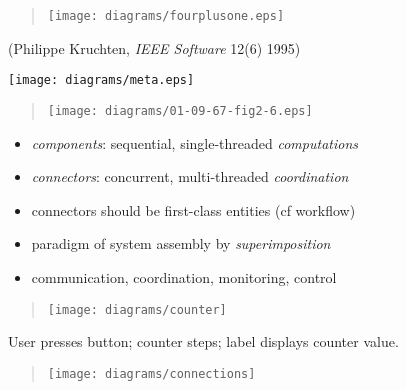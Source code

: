 \documentclass{sepslide-soa-faked} %
\begin{document}
\begin{slide}
\begin{quote}
\texttt{[image: diagrams/fourplusone.eps]}
\end{quote}
(Philippe Kruchten, \textit{IEEE Software} 12(6) 1995)
\end{slide}

\begin{slide}
\texttt{[image: diagrams/meta.eps]}
\end{slide}

\begin{slide}
\begin{quote}
\texttt{[image: diagrams/01-09-67-fig2-6.eps]}
\end{quote}
\end{slide}

\begin{slide}
\begin{itemize}
\item \emph{components}: sequential, single-threaded \emph{computations}
\item \emph{connectors}: concurrent, multi-threaded \emph{coordination}
\item connectors should be first-class entities (cf workflow)
\item paradigm of system assembly by \emph{superimposition}
\item communication, coordination, monitoring, control
\end{itemize}
\end{slide}

\begin{slide}
\begin{quote}
\texttt{[image: diagrams/counter]}
\end{quote}
User presses button; counter steps; label displays counter value.
\end{slide}

\begin{slide}
\begin{quote}
\texttt{[image: diagrams/connections]}
\end{quote}
\end{slide}
\end{document}
